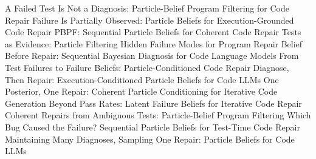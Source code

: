 \newcommand{\PBPFTitleChoice}[2]{\expandafter\def\csname PBPFTitle#1\endcsname{#2}}
\PBPFTitleChoice{1}{A Failed Test Is Not a Diagnosis: Particle-Belief Program Filtering for Code Repair}
\PBPFTitleChoice{2}{Failure Is Partially Observed: Particle Beliefs for Execution-Grounded Code Repair}
\PBPFTitleChoice{3}{PBPF: Sequential Particle Beliefs for Coherent Code Repair}
\PBPFTitleChoice{4}{Tests as Evidence: Particle Filtering Hidden Failure Modes for Program Repair}
\PBPFTitleChoice{5}{Belief Before Repair: Sequential Bayesian Diagnosis for Code Language Models}
\PBPFTitleChoice{6}{From Test Failures to Failure Beliefs: Particle-Conditioned Code Repair}
\PBPFTitleChoice{7}{Diagnose, Then Repair: Execution-Conditioned Particle Beliefs for Code LLMs}
\PBPFTitleChoice{8}{One Posterior, One Repair: Coherent Particle Conditioning for Iterative Code Generation}
\PBPFTitleChoice{9}{Beyond Pass Rates: Latent Failure Beliefs for Iterative Code Repair}
\PBPFTitleChoice{10}{Coherent Repairs from Ambiguous Tests: Particle-Belief Program Filtering}
\PBPFTitleChoice{11}{Which Bug Caused the Failure? Sequential Particle Beliefs for Test-Time Code Repair}
\PBPFTitleChoice{12}{Maintaining Many Diagnoses, Sampling One Repair: Particle Beliefs for Code LLMs}
